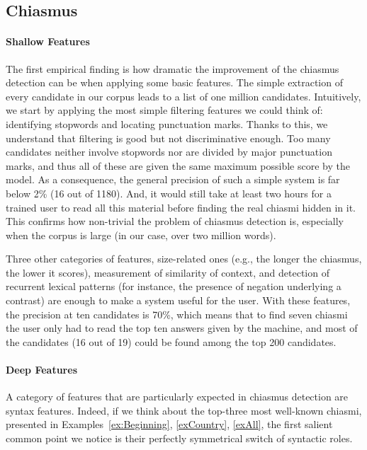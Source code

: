\subsection{Chiasmus}
\paragraph{Shallow Features}
The first empirical finding is how dramatic the improvement of the chiasmus detection can be when applying some basic features. The simple extraction of every candidate in our corpus leads to a list of one million candidates. Intuitively, we start by applying the most simple filtering features we could think of: identifying stopwords and locating punctuation marks. Thanks to this, we understand that filtering is good but not discriminative enough. Too many candidates neither involve stopwords nor are divided by major punctuation marks, and thus all of these are given the same maximum possible score by the model. As a consequence, the general precision of such a simple system is far below 2\% (16 out of 1180). And, it would still take at least two hours for a trained user to read all this material before finding the real chiasmi hidden in it. This confirms how non-trivial the problem of chiasmus detection is, especially when the corpus is large (in our case, over two million words).

Three other categories of features, size-related ones (e.g., the longer the chiasmus, the lower it scores), measurement of similarity of context, and detection of recurrent lexical patterns (for instance, the presence of negation underlying a contrast) are enough to make a system useful for the user. With these features, the precision at ten candidates is 70\%, which means that to find seven chiasmi the user only had to read the top ten answers given by the machine, and most of the candidates (16 out of 19) could be found among the top 200 candidates.


\paragraph{Deep Features}
A category of features that are particularly expected in chiasmus detection are  syntax features. Indeed, if we think about the top-three most well-known chiasmi, presented in Examples~\ref{ex:Beginning}, \ref{exCountry}, \ref{exAll}, the first salient common point we notice is their perfectly symmetrical switch of syntactic roles. 

%
\vspace{-0.6cm}
%
\vspace{-0.6cm}
%
%

